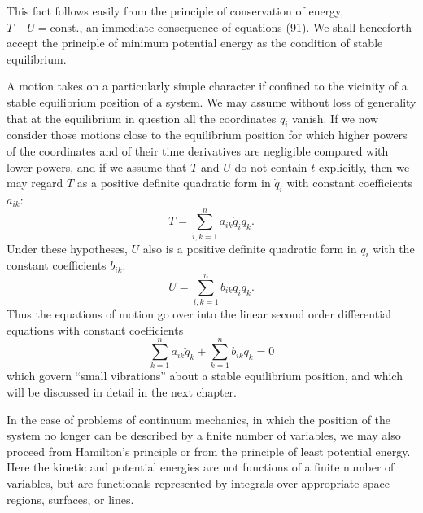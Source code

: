 This fact follows easily from the principle of conservation of energy, $T+U=\text{const.}$, an immediate consequence of equations (91). We shall henceforth accept the principle of minimum potential energy as the condition of stable equilibrium.

A motion takes on a particularly simple character if confined to the vicinity of a stable equilibrium position of a system. We may assume without loss of generality that at the equilibrium in question all the coordinates $q_i$ vanish. If we now consider those motions close to the equilibrium position for which higher powers of the coordinates and of their time derivatives are negligible compared with lower powers, and if we assume that $T$ and $U$ do not contain $t$ explicitly, then we may regard $T$ as a positive definite quadratic form in $\dot q_i$ with constant coefficients $a_{ik}$:
\[
T=\sum_{i,k=1}^n a_{ik}\dot q_i\dot q_k.
\]
Under these hypotheses, $U$ also is a positive definite quadratic form in $q_i$ with the constant coefficients $b_{ik}$:
\[
U=\sum_{i,k=1}^n b_{ik}q_iq_k.
\]
Thus the equations of motion go over into the linear second order differential equations with constant coefficients
\[
\sum_{k=1}^n a_{ik}\ddot q_k+\sum_{k=1}^n b_{ik}q_k=0
\]
which govern ``small vibrations'' about a stable equilibrium position, and which will be discussed in detail in the next chapter.

In the case of problems of continuum mechanics, in which the position of the system no longer can be described by a finite number of variables, we may also proceed from Hamilton's principle or from the principle of least potential energy. Here the kinetic and potential energies are not functions of a finite number of variables, but are functionals represented by integrals over appropriate space regions, surfaces, or lines.

